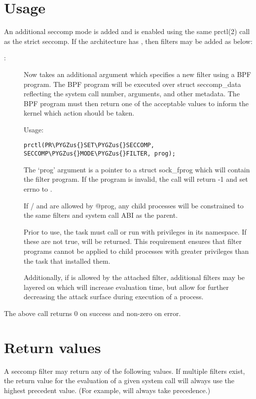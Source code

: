 \documentclass[a4paper,8pt,english]{sphinxmanual}
\def\PYGZus{\char`\_}
\begin{document}
\section{Usage}
\label{userspace-api/seccomp_filter:usage}
An additional seccomp mode is added and is enabled using the same
prctl(2) call as the strict seccomp.  If the architecture has
, then filters may be added as below:
\begin{description}
\item[{:}] \leavevmode
Now takes an additional argument which specifies a new filter
using a BPF program.
The BPF program will be executed over struct seccomp\_data
reflecting the system call number, arguments, and other
metadata.  The BPF program must then return one of the
acceptable values to inform the kernel which action should be
taken.

Usage:

\begin{Verbatim}[commandchars=\\\{\}]
prctl(PR\PYGZus{}SET\PYGZus{}SECCOMP, SECCOMP\PYGZus{}MODE\PYGZus{}FILTER, prog);
\end{Verbatim}

The `prog' argument is a pointer to a struct sock\_fprog which
will contain the filter program.  If the program is invalid, the
call will return -1 and set errno to .

If / and  are allowed by @prog, any child
processes will be constrained to the same filters and system
call ABI as the parent.

Prior to use, the task must call  or
run with  privileges in its namespace.  If these are not
true,  will be returned.  This requirement ensures that filter
programs cannot be applied to child processes with greater privileges
than the task that installed them.

Additionally, if  is allowed by the attached filter,
additional filters may be layered on which will increase evaluation
time, but allow for further decreasing the attack surface during
execution of a process.

\end{description}

The above call returns 0 on success and non-zero on error.


\section{Return values}
\label{userspace-api/seccomp_filter:return-values}
A seccomp filter may return any of the following values. If multiple
filters exist, the return value for the evaluation of a given system
call will always use the highest precedent value. (For example,
 will always take precedence.)
\end{document}
